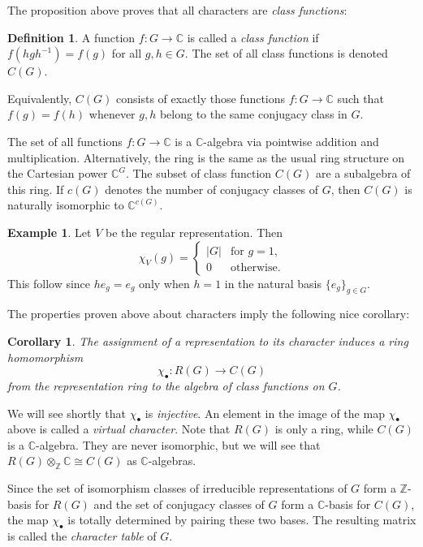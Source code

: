 \documentclass[12pt]{article}
\theoremstyle{plain}
\newtheorem{corollary}[theorem]{Corollary}
\theoremstyle{definition}
\newtheorem{definition}[theorem]{Definition}
\newtheorem{example}[theorem]{Example}
\theoremstyle{remark}
\numberwithin{equation}{section}
\begin{document}
The proposition above proves that all characters are \emph{class
functions}:

\begin{definition}
A function $f : G \to \mathbb{C}$ is called a \emph{class function}
if $f(hgh^{-1})=f(g)$ for all $g,h \in G$.
The set of all class functions is denoted $C(G)$.
\end{definition}

Equivalently, $C(G)$ consists of exactly those functions $f : G \to
\mathbb{C}$ such that $f(g)=f(h)$ whenever $g, h$ belong to the
same conjugacy class in $G$.

The set of all functions $f : G \to \mathbb{C}$ is a
$\mathbb{C}$-algebra via pointwise addition and multiplication.
Alternatively, the ring is the same as the usual ring structure on the
Cartesian power $\mathbb{C}^G$.
The subset of class function $C(G)$ are a subalgebra of this ring.
If $c(G)$ denotes the number of conjugacy classes of $G$,
then $C(G)$ is naturally isomorphic to $\mathbb{C}^{c(G)}$.

\begin{example} \label{eg:regular_rep}
Let $V$ be the regular representation.  Then
\[
\chi_V(g) = \begin{cases}
|G| & \textrm{for $g=1$},\\
0 & \textrm{otherwise}.
\end{cases}
\]
This follow since $he_g=e_g$ only when $h = 1$ in the natural basis $\{e_g\}_{g \in G}$.
\end{example}

The properties proven above about characters imply the following nice
corollary:

\begin{corollary}
The assignment of a representation to its character
induces a ring homomorphism
\[
\chi_{\bullet}: R(G) \to C(G)
\]
from the representation ring to the algebra of class functions on $G$.
\end{corollary}

We will see shortly that $\chi_{\bullet}$ is \emph{injective}.
An element in the image of the map $\chi_{\bullet}$ above is called a \emph{virtual
character}.  Note that $R(G)$ is only a ring, while $C(G)$ is a
$\mathbb{C}$-algebra.  They are never isomorphic, but we will see that
$R(G) \otimes_\mathbb{Z} \mathbb{C} \cong C(G)$ as $\mathbb{C}$-algebras.

Since the set of isomorphism classes of irreducible representations of
$G$ form a $\mathbb{Z}$-basis for $R(G)$
and the set of conjugacy classes of $G$
form a $\mathbb{C}$-basis for $C(G)$,
the map $\chi_{\bullet}$ is totally determined by pairing these two bases.
The resulting matrix is called the \emph{character table} of $G$.
\end{document}

